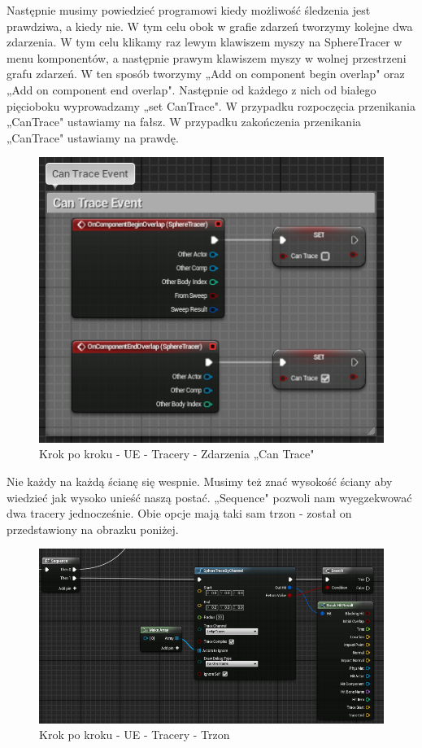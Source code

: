 \documentclass[openright]{xmgr}
\begin{document}
\newpage
Następnie musimy powiedzieć programowi kiedy możliwość śledzenia jest prawdziwa, a kiedy nie. W tym celu obok w grafie zdarzeń tworzymy kolejne dwa zdarzenia. W tym celu klikamy raz lewym klawiszem myszy na SphereTracer w menu komponentów, a następnie prawym klawiszem myszy w wolnej przestrzeni grafu zdarzeń. W ten sposób tworzymy „Add on component begin overlap" oraz „Add on component end overlap". Następnie od każdego z nich od białego pięcioboku wyprowadzamy „set CanTrace". W przypadku rozpoczęcia przenikania „CanTrace" ustawiamy na fałsz. W przypadku zakończenia przenikania „CanTrace" ustawiamy na prawdę.

\begin{figure}[!htb]
    \begin{center}
    \includegraphics[scale=0.5]{Screeny/UeKrokPoKroku/UE-canTrace}
    \end{center}
    \caption{Krok po kroku - UE - Tracery - Zdarzenia „Can Trace"}
\end{figure}

Nie każdy na każdą ścianę się wespnie. Musimy też znać wysokość ściany aby wiedzieć jak wysoko unieść naszą postać. „Sequence" pozwoli nam wyegzekwować dwa tracery jednocześnie. Obie opcje mają taki sam trzon - został on przedstawiony na obrazku poniżej.

\begin{figure}[!htb]
    \begin{center}
    \includegraphics[scale=0.5]{Screeny/UeKrokPoKroku/UE-Tracer}
    \end{center}
    \caption{Krok po kroku - UE - Tracery - Trzon}
\end{figure}
\end{document}
